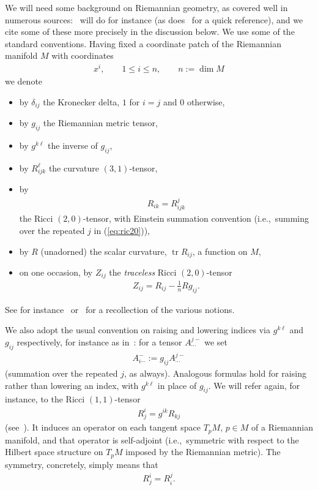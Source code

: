 \documentclass[10pt,a4paper]{amsart}
\numberwithin{equation}{section}
\begin{document}
We will need some background on Riemannian geometry, as covered well in numerous sources:~\cite{berg-pan,bes,doC92,kn1,pet} will do for instance (as does~\cite[Appendix A]{ck-ric} for a quick reference), and we cite some of these more precisely in the discussion below. We use some of the standard conventions. Having fixed a coordinate patch of the Riemannian manifold $M$ with coordinates
\begin{gather*}
 x^i,\qquad 1\le i\le n,\qquad n:=\dim M
\end{gather*}
we denote
\begin{itemize}\itemsep=0pt
\item by $\delta_{ij}$ the Kronecker delta, $1$ for $i=j$ and $0$ otherwise,
\item by $g_{ij}$ the Riemannian metric tensor,
\item by $g^{k\ell}$ the inverse of $g_{ij}$,
\item by $R_{ijk}^{\ell}$ the curvature $(3,1)$-tensor,
\item by
 \begin{gather}
 R_{ik} = R_{ijk}^j\label{eq:ric20}
 \end{gather}
 the Ricci $(2,0)$-tensor, with Einstein summation convention (i.e.,~summing over the repe\-ated $j$ in (\ref{eq:ric20})),
\item by $R$ (unadorned) the scalar curvature, $\operatorname{tr} R_{ij}$, a function on $M$,
\item on one occasion, by $Z_{ij}$ the {\it traceless} Ricci $(2,0)$-tensor
 \begin{gather}\label{eq:trric}
 Z_{ij} = R_{ij} - \frac{1}{n} R g_{ij}.
 \end{gather}
\end{itemize}
See for instance~\cite[Chapter~1]{bes} or~\cite[Chapter~3]{pet} for a recollection of the various notions.


We also adopt the usual convention on raising and lowering indices via $g^{k\ell}$ and $g_{ij}$ respectively, for instance as in~\cite[Section~1.42]{bes}: for a tensor $A_{\cdots}^{j -}$ we set
\begin{gather*}
 A_{i\cdots}^{-}:=g_{ij}A_{\cdots}^{j -}
\end{gather*}
(summation over the repeated $j$, as always). Analogous formulas hold for raising rather than lowering an index, with $g^{k\ell}$ in place of $g_{ij}$. We will refer again, for instance, to the Ricci $(1,1)$-tensor
\begin{gather*}
 R^i_j = g^{ik}R_{kj}
\end{gather*}
(see~\cite[Remark 1.91]{bes}). It induces an operator on each tangent space $T_pM$, $p\in M$ of a Riemannian manifold, and that operator is self-adjoint (i.e.,~symmetric with respect to the Hilbert space structure on $T_pM$ imposed by the Riemannian metric). The symmetry, concretely, simply means that
\begin{gather*}
 R^i_j = R_i^j.
\end{gather*}
\end{document}
